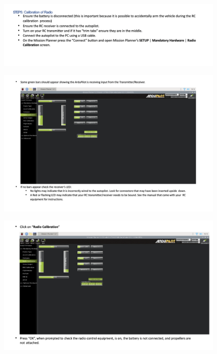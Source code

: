 \begin{figure}[h!]
\centering
\includegraphics[width=\columnwidth]{./Figures/config_img34.png}
\end{figure}

\begin{figure}[h!]
\centering
\includegraphics[width=\columnwidth]{./Figures/config_img35.png}
\end{figure}

\begin{figure}[h!]
\centering
\includegraphics[width=\columnwidth]{./Figures/config_img36.png}
\end{figure}

